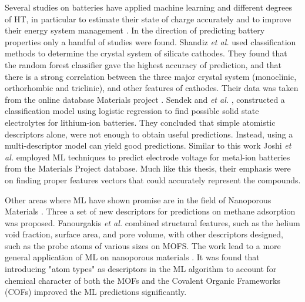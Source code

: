 Several studies on batteries have applied machine learning and different degrees of HT, in particular to estimate their state of charge accurately and to improve their energy system management  \cite{kalawoun2015novel} \cite{chemali2018state} \cite{hu2015battery} \cite{ermon2013learning}.
	In the direction of predicting battery properties only a handful of studies were found. Shandiz \textit{et al.} \cite{shandiz2016application} used classification methods to determine the crystal system of silicate cathodes. They found that the random forest classifier gave the highest accuracy of prediction, and that there is a strong correlation between the three major crystal system (monoclinic, orthorhombic and triclinic), and other features of cathodes. Their data was taken from the online database Materials project \cite{Jain2013} \cite{Zhou2004a} \cite{Adams2011a}.
	Sendek and \textit{et al.} \cite{sendek2017holistic}, constructed a classification model using logistic regression to find possible solid state electrolytes for lithium-ion batteries. They concluded that simple atomistic descriptors alone, were not enough to obtain useful predictions. Instead, using a multi-descriptor model can yield good predictions.
	Similar to this work Joshi \textit{et al.} \cite{joshi2019machine} employed ML techniques to predict electrode voltage for metal-ion batteries from the Materials Project database. Much like this thesis, their emphasis were on finding proper features vectors that could accurately represent the compounds.

Other areas where ML have shown promise are in the field of Nanoporous Materials \cite{fanourgakis2019robust}. Three a set of new descriptors for predictions on methane adsorption was proposed. Fanourgakis \textit{et al.} combined structural features, such as the helium void fraction, surface area, and pore volume, with other descriptors designed, such as the probe atoms of various sizes on MOFS. The work lead to a more general application of ML on nanoporous materials \cite{fanourgakis2020universal}. It was found that introducing "atom types" as descriptors in the ML algorithm to account for chemical character of both the MOFs and the Covalent Organic Frameworks (COFs) improved the ML predictions significantly.
